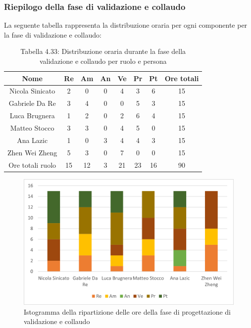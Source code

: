\subsubsection{Riepilogo della fase di validazione e collaudo }
%
La seguente tabella rappresenta la distribuzione oraria per ogni componente per la fase di validazione e collaudo:
\begin{table}[h]
	\setlength\extrarowheight{5pt}
	\centering
	\begin{tabularx}{\textwidth}{|ccccccc|c|}
		\hline
		\rowcolor{white}
		\textbf{Nome} & \textbf{Re} & \textbf{Am} & \textbf{An} & \textbf{Ve} & \textbf{Pr}& \textbf{Pt} & \textbf{Ore totali} \\
		\hline
		Nicola Sinicato &2&0&0&4&3&6&15 \\
		Gabriele Da Re &3&4&0&0&5&3&15 \\
		Luca Brugnera &1&2&0&2&6&4&15 \\
		Matteo Stocco &3&3&0&4&5&0&15 \\
		Ana Lazic &1&0&3&4&4&3&15 \\
		Zhen Wei Zheng &5&3&0&7&0&0&15 \\
		\hline
		Ore totali ruolo &15&12&3&21&23&16&90 \\
		\hline
	\end{tabularx}
	\vspace{10pt}
	\caption{Tabella 4.33: Distribuzione oraria durante la fase della validazione e collaudo per ruolo e persona}
\end{table}
\begin{figure}[H]
    \centering
    \includegraphics[scale=0.6]{img/grafi preventivo/istogrammi/validazione/complessivo.png}
    \caption{Istogramma della ripartizione delle ore della fase di progettazione di validazione e collaudo}
\end{figure}
